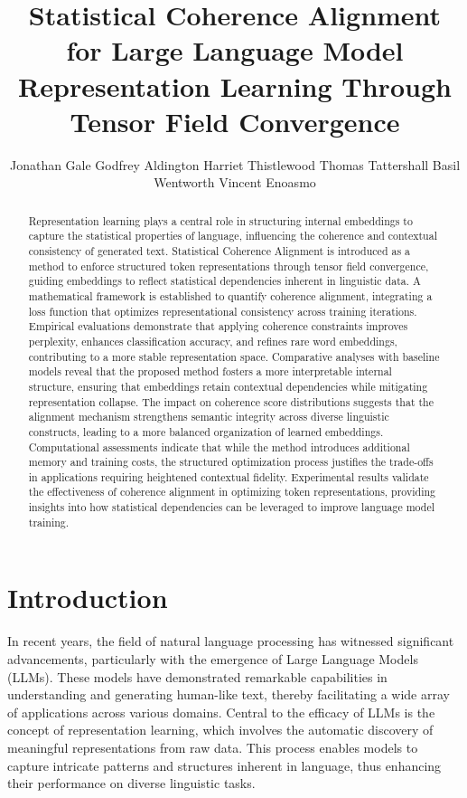 \documentclass{article}
\title{Statistical Coherence Alignment for Large Language Model Representation Learning Through Tensor Field Convergence}
\author{
  Jonathan Gale \And Godfrey Aldington \And Harriet Thistlewood \And Thomas Tattershall \And Basil Wentworth \And Vincent Enoasmo}
\begin{document}
\maketitle


\begin{abstract}
Representation learning plays a central role in structuring internal embeddings to capture the statistical properties of language, influencing the coherence and contextual consistency of generated text. Statistical Coherence Alignment is introduced as a method to enforce structured token representations through tensor field convergence, guiding embeddings to reflect statistical dependencies inherent in linguistic data. A mathematical framework is established to quantify coherence alignment, integrating a loss function that optimizes representational consistency across training iterations. Empirical evaluations demonstrate that applying coherence constraints improves perplexity, enhances classification accuracy, and refines rare word embeddings, contributing to a more stable representation space. Comparative analyses with baseline models reveal that the proposed method fosters a more interpretable internal structure, ensuring that embeddings retain contextual dependencies while mitigating representation collapse. The impact on coherence score distributions suggests that the alignment mechanism strengthens semantic integrity across diverse linguistic constructs, leading to a more balanced organization of learned embeddings. Computational assessments indicate that while the method introduces additional memory and training costs, the structured optimization process justifies the trade-offs in applications requiring heightened contextual fidelity. Experimental results validate the effectiveness of coherence alignment in optimizing token representations, providing insights into how statistical dependencies can be leveraged to improve language model training. 

\end{abstract}





\section{Introduction}

In recent years, the field of natural language processing has witnessed significant advancements, particularly with the emergence of Large Language Models (LLMs). These models have demonstrated remarkable capabilities in understanding and generating human-like text, thereby facilitating a wide array of applications across various domains. Central to the efficacy of LLMs is the concept of representation learning, which involves the automatic discovery of meaningful representations from raw data. This process enables models to capture intricate patterns and structures inherent in language, thus enhancing their performance on diverse linguistic tasks.
\end{document}
